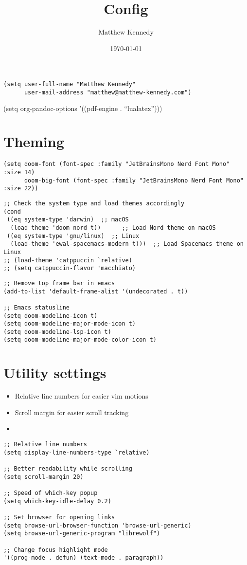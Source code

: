 \documentclass[11pt]{article}
\author{Matthew Kennedy}
\date{\today}
\title{Config}
\begin{document}
\maketitle
\tableofcontents

\begin{verbatim}
(setq user-full-name "Matthew Kennedy"
      user-mail-address "matthew@matthew-kennedy.com")
\end{verbatim}

(setq org-pandoc-options '((pdf-engine . ``lualatex'')))
\section{Theming}
\label{sec:org8c15005}
\begin{verbatim}
(setq doom-font (font-spec :family "JetBrainsMono Nerd Font Mono" :size 14)
      doom-big-font (font-spec :family "JetBrainsMono Nerd Font Mono" :size 22))
\end{verbatim}

\begin{verbatim}
;; Check the system type and load themes accordingly
(cond
 ((eq system-type 'darwin)  ;; macOS
  (load-theme 'doom-nord t))      ;; Load Nord theme on macOS
 ((eq system-type 'gnu/linux)  ;; Linux
  (load-theme 'ewal-spacemacs-modern t)))  ;; Load Spacemacs theme on Linux
;; (load-theme 'catppuccin `relative)
;; (setq catppuccin-flavor 'macchiato)
\end{verbatim}

\begin{verbatim}
;; Remove top frame bar in emacs
(add-to-list 'default-frame-alist '(undecorated . t))

;; Emacs statusline
(setq doom-modeline-icon t)
(setq doom-modeline-major-mode-icon t)
(setq doom-modeline-lsp-icon t)
(setq doom-modeline-major-mode-color-icon t)
\end{verbatim}
\section{Utility settings}
\label{sec:orgccb5168}
\begin{itemize}
\item Relative line numbers for easier vim motions
\item Scroll margin for easier scroll tracking
\item 
\end{itemize}
\begin{verbatim}
;; Relative line numbers
(setq display-line-numbers-type `relative)

;; Better readability while scrolling
(setq scroll-margin 20)

;; Speed of which-key popup
(setq which-key-idle-delay 0.2)

;; Set browser for opening links
(setq browse-url-browser-function 'browse-url-generic)
(setq browse-url-generic-program "librewolf")

;; Change focus highlight mode
'((prog-mode . defun) (text-mode . paragraph))
\end{verbatim}
\end{document}
